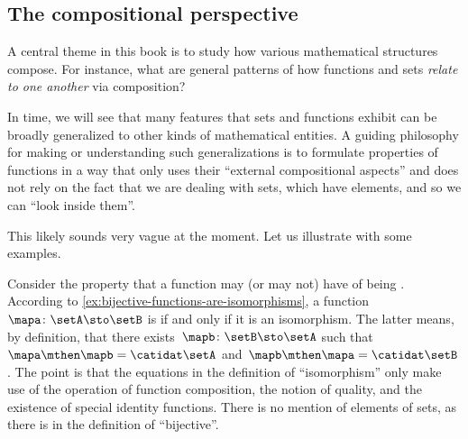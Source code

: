 \subsection{The compositional perspective}

A central theme in this book is to study how various mathematical structures compose.
For instance, what are general patterns of how functions and sets \emph{relate to one another} via composition?

In time, we will see that many features that sets and functions exhibit can be broadly generalized to other kinds of mathematical entities.
A guiding philosophy for making or understanding such generalizations is to formulate properties of functions in a way that only uses their ``external compositional aspects'' and does not rely on the fact that we are dealing with sets, which have elements, and so we can ``look inside them''.

This likely sounds very vague at the moment.
Let us illustrate with some examples.

\begin{example}
    Consider the property that a function may (or may not) have of being .
    According to \cref{ex:bijective-functions-are-isomorphisms}, a function~$\mapa\colon \setA \sto \setB$ is  if and only if it is an isomorphism.
    The latter means, by definition, that there exists~$\mapb \colon \setB \sto \setA$ such that~$\mapa \mthen \mapb = \catidat\setA$ and~$\mapb \mthen \mapa = \catidat\setB$.
    The point is that the equations in the definition of ``isomorphism'' only make use of the operation of function composition, the notion of quality, and the existence of special identity functions.
    There is no mention of elements of sets, as there is in the definition of ``bijective''.
\end{example}

